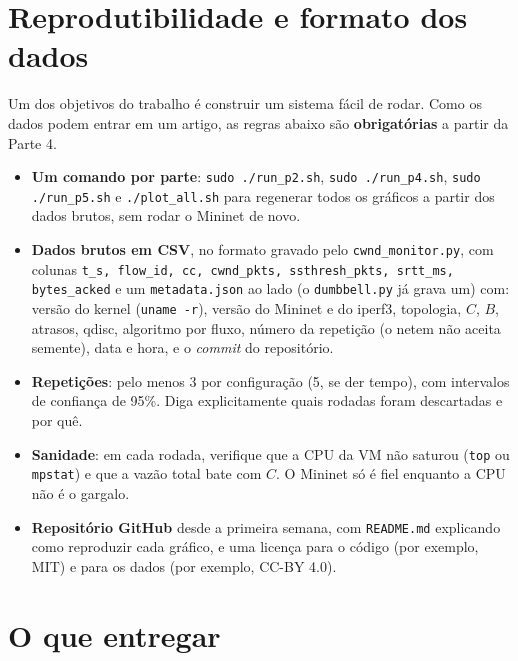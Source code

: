 \documentclass[11pt,a4paper]{article}
\begin{document}
\section{Reprodutibilidade e formato dos dados}
\label{sec:repro}

Um dos objetivos do trabalho é construir um sistema fácil de rodar. Como os dados podem
entrar em um artigo, as regras abaixo são \textbf{obrigatórias} a partir da Parte 4.

\begin{itemize}
\item \textbf{Um comando por parte}: \texttt{sudo ./run\_p2.sh}, \texttt{sudo ./run\_p4.sh},
\texttt{sudo ./run\_p5.sh} e \texttt{./plot\_all.sh} para regenerar todos os
gráficos a partir dos dados brutos, sem rodar o Mininet de novo.
\item \textbf{Dados brutos em CSV}, no formato gravado pelo \texttt{cwnd\_monitor.py}, com colunas
\texttt{t\_s, flow\_id, cc, cwnd\_pkts, ssthresh\_pkts, srtt\_ms, bytes\_acked} e um
\texttt{metadata.json} ao lado (o \texttt{dumbbell.py} já grava um) com: versão do kernel (\texttt{uname -r}), versão do
Mininet e do iperf3, topologia, $C$, $B$, atrasos, qdisc, algoritmo por fluxo, número da
repetição (o netem não aceita semente), data e hora, e o \emph{commit} do repositório.
\item \textbf{Repetições}: pelo menos 3 por configuração (5, se der tempo), com intervalos
de confiança de 95\%. Diga explicitamente quais rodadas foram descartadas e por quê.
\item \textbf{Sanidade}: em cada rodada, verifique que a CPU da VM não saturou
(\texttt{top} ou \texttt{mpstat}) e que a vazão total bate com $C$. O Mininet só é fiel
enquanto a CPU não é o gargalo.
\item \textbf{Repositório GitHub} desde a primeira semana, com \texttt{README.md}
explicando como reproduzir cada gráfico, e uma licença para o código (por exemplo, MIT)
e para os dados (por exemplo, CC-BY 4.0).
\end{itemize}

\section{O que entregar}
\label{sec:entrega}
\end{document}
